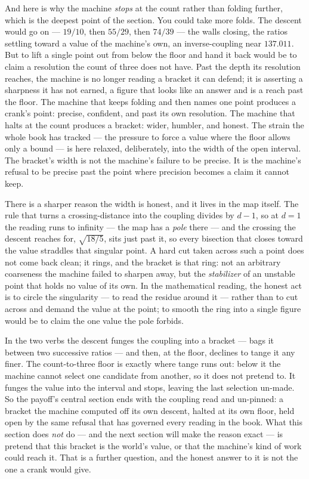 And here is why the machine \emph{stops} at the count rather than folding further, which is the deepest point of the
section. You could take more folds. The descent would go on --- $19/10$, then $55/29$, then $74/39$ --- the walls
closing, the ratios settling toward a value of the machine's own, an inverse-coupling near $137.011$. But to lift a single point out from below
the floor and hand it back would be to claim a resolution the count of three does not have. Past the depth its
resolution reaches, the machine is no longer reading a bracket it can defend; it is asserting a sharpness it has not
earned, a figure that looks like an answer and is a reach past the floor. The machine that keeps folding and then names
one point produces a crank's point: precise, confident, and past its own resolution. The machine that halts at the count
produces a bracket: wider, humbler, and honest. The strain the whole book has tracked --- the pressure to force a value
where the floor allows only a bound --- is here relaxed, deliberately, into the width of the open interval. The
bracket's width is not the machine's failure to be precise. It is the machine's refusal to be precise past the point
where precision becomes a claim it cannot keep.

There is a sharper reason the width is honest, and it lives in the map itself. The rule that turns a crossing-distance
into the coupling divides by $d-1$, so at $d=1$ the reading runs to infinity --- the map has a \emph{pole} there --- and
the crossing the descent reaches for, $\sqrt{18/5}$, sits just past it, so every bisection that closes toward the value
straddles that singular point. A hard cut taken across such a point does not come back clean; it rings, and the bracket
is that ring: not an arbitrary coarseness the machine failed to sharpen away, but the \emph{stabilizer} of an unstable
point that holds no value of its own. In the mathematical reading, the honest act is to circle the singularity --- to
read the residue around it --- rather than to cut across and demand the value at the point; to smooth the ring into a
single figure would be to claim the one value the pole forbids.

In the two verbs the descent funges the coupling into a bracket --- bags it between two successive ratios --- and then,
at the floor, declines to tange it any finer. The count-to-three floor is exactly where tange runs out: below it the
machine cannot select one candidate from another, so it does not pretend to. It funges the value into the interval and
stops, leaving the last selection un-made. So the payoff's central section ends with the coupling read and un-pinned: a
bracket the machine computed off its own descent, halted at its own floor, held open by the same refusal that has
governed every reading in the book. What this section does \emph{not} do --- and the next section will make the reason
exact --- is pretend that this bracket is the world's value, or that the machine's kind of work could reach it. That is
a further question, and the honest answer to it is not the one a crank would give.

